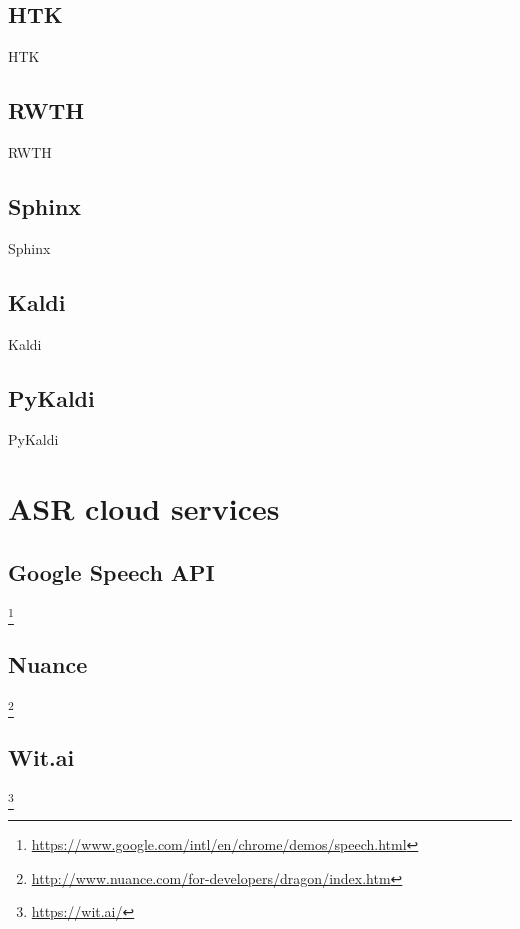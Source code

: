\subsection{HTK}
HTK \cite{young1997htk}
\blindtext

\subsection{RWTH}
RWTH \cite{rybach2009rwth}
\blindtext

\subsection{Sphinx}
Sphinx \cite{lee1990overview}
\blindtext

\subsection{Kaldi}
Kaldi \cite{povey2011kaldi}
\blindtext

\subsection{PyKaldi}
PyKaldi \cite{platek2014free}
\blindtext


\section{ASR cloud services}
\blindtext

\subsection{Google Speech API}
\footnote{\url{https://www.google.com/intl/en/chrome/demos/speech.html}}
\blindtext

\subsection{Nuance}
\footnote{\url{http://www.nuance.com/for-developers/dragon/index.htm}}
\blindtext

\subsection{Wit.ai}
\footnote{\url{https://wit.ai/}}
\blindtext

